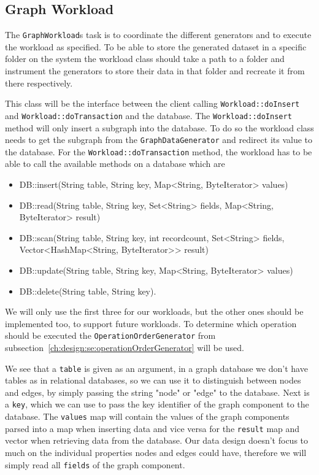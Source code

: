 \subsection{Graph Workload}
The \texttt{GraphWorkload}s task is to coordinate the different generators and to execute the workload as specified.
To be able to store the generated dataset in a specific folder on the system the workload class should take a path to a folder and instrument the generators to store their data in that folder and recreate it from there respectively.

This class will be the interface between the client calling \texttt{Workload::doInsert} and \texttt{Workload::doTransaction} and the database.
The \texttt{Workload::doInsert} method will only insert a subgraph into the database.
To do so the workload class needs to get the subgraph from the \texttt{GraphDataGenerator} and redirect its value to the database.
For the \texttt{Workload::doTransaction} method,
the workload has to be able to call the available methods on a database which are

\begin{itemize}
  \item DB::insert(String table, String key, Map<String, ByteIterator> values)
  \item DB::read(String table, String key, Set<String> fields, Map<String, ByteIterator> result)
  \item DB::scan(String table, String key, int recordcount, Set<String> fields, Vector<HashMap<String, ByteIterator>{}> result)
  \item DB::update(String table, String key, Map<String, ByteIterator> values)
  \item DB::delete(String table, String key).
\end{itemize}

We will only use the first three for our workloads,
but the other ones should be implemented too,
to support future workloads.
To determine which operation should be executed the \texttt{OperationOrderGenerator} from subsection~\ref{ch:design:se:operationOrderGenerator} will be used.

We see that a \texttt{table} is given as an argument,
in a graph database we don't have tables as in relational databases,
so we can use it to distinguish between nodes and edges,
by simply passing the string "node" or "edge" to the database.
Next is a \texttt{key},
which we can use to pass the key identifier of the graph component to the database.
The \texttt{values} map will contain the values of the graph components parsed into a map when inserting data and vice versa for the \texttt{result} map and vector when retrieving data from the database.
Our data design doesn't focus to much on the individual properties nodes and edges could have,
therefore we will simply read all \texttt{fields} of the graph component.

